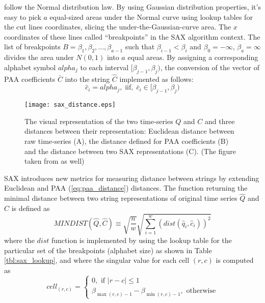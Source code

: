 follow the Normal distribution law. By using Gaussian distribution properties, it's easy to pick $a$ equal-sized areas under the Normal curve using  lookup tables  \cite{citeulike:4434481} for the cut lines coordinates, slicing the under-the-Gaussian-curve area. 
The $x$ coordinates of these lines called ``breakpoints'' in the SAX algorithm context. The list of breakpoints $B=\beta_{1}, \beta_{2}, ... , \beta_{a-1}$ such that $\beta_{i-1} < \beta_{i}$ and $\beta_{0} = -\infty$, $\beta_{a} = \infty$ divides the area under $N(0,1)$ into $a$ equal areas. By assigning a corresponding alphabet symbol $alpha_{j}$ to each interval $[\beta_{j-1},\beta_{j})$, the conversion of the vector of PAA coefficients $\bar{C}$ into the string $\hat{C}$ implemented as follows:
\begin{equation}
\hat{c}_{i} = alpha_{j}, \; \text{iif}, \; \bar{c}_{i} \in [\beta_{j-1},\beta_{j})
\label{eq:alpha}
\end{equation}

\begin{figure}[tbp]
   \centering
   \texttt{[image: sax\_distance.eps]}
   \caption{The visual representation of the two time-series $Q$ and $C$ and three distances between their representation: Euclidean distance between raw time-series (A), the distance defined for PAA coefficients (B) and the distance between two SAX representations (C). (The figure taken from \cite{citeulike:2821475} as well)}
   \label{fig:sax_distance}
\end{figure}

SAX introduces new metrics for measuring distance between strings by extending Euclidean and PAA (\ref{eq:paa_distance}) distances. The function returning the minimal distance between two string representations of original time series $\hat{Q}$ and $\hat{C}$ is defined as
\begin{equation}
MINDIST(\hat{Q},\hat{C}) \equiv \sqrt{ \frac{n}{w} } \sqrt{ \sum_{i=1}^{w} ( dist( \hat{q}_{i}, \hat{c}_{i} ) )^{2}}
\label{eq:sax_mindist}
\end{equation} 
where the $dist$ function is implemented by using the lookup table for the particular set of the breakpoints (alphabet size) as shown in Table \ref{tbl:sax_lookup}, and where the singular value for each cell $(r,c)$ is computed as 
\begin{equation}
cell_{(r,c)} = 
\begin{cases} 
0, \text{ if }\left| r-c \right| \leq 1 \\
\beta_{\max(r,c) - 1} - \beta_{\min(r,c) - 1}, \text{ otherwise}
\end{cases}
\label{eq:cell}
\end{equation}

